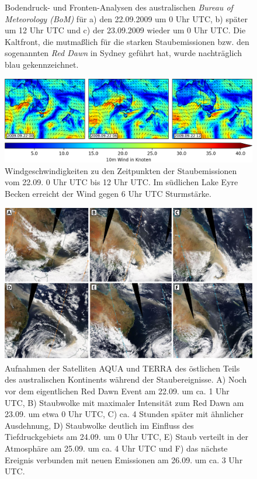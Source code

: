 \documentclass[12pt,a4paper,onecolumn]{scrartcl}
\begin{document}
\begin{figure}[!htb]
\begin{minipage}[c]{0.33\textwidth}
	\end{minipage}\hfill
	\caption{Bodendruck- und Fronten-Analysen des australischen \textit{Bureau of Meteorology (BoM)} für a) den 22.09.2009 um 0 Uhr UTC, b) später um 12 Uhr UTC und c) der 23.09.2009 wieder um 0 Uhr UTC. Die Kaltfront, die mutmaßlich für die starken Staubemissionen bzw. den sogenannten \textit{Red Dawn} in Sydney geführt hat, wurde nachträglich blau gekennzeichnet.} \label{fig:bom_analysis}
\end{figure}
\begin{figure}[!htb]
\includegraphics[width=\textwidth]{bilder/reddawn/wind_reddawn_small.png}
\caption{Windgeschwindigkeiten zu den Zeitpunkten der Staubemissionen vom 22.09. 0 Uhr UTC bis 12 Uhr UTC. Im südlichen Lake Eyre Becken erreicht der Wind gegen 6 Uhr UTC Sturmstärke.} \label{fig:wind_reddawn}
\end{figure}
\begin{figure}[!htb]
\includegraphics[width=\textwidth]{bilder/reddawn/reddawn_satellite.pdf}
\caption{Aufnahmen der Satelliten AQUA und TERRA des östlichen Teils des australischen Kontinents während der Staubereignisse. A) Noch vor dem eigentlichen Red Dawn Event am 22.09. um ca. 1 Uhr UTC, B) Staubwolke mit maximaler Intensität zum Red Dawn am 23.09. um etwa 0 Uhr UTC, C) ca. 4 Stunden später mit ähnlicher Ausdehnung, D) Staubwolke deutlich im Einfluss des Tiefdruckgebiets am 24.09. um 0 Uhr UTC, E) Staub verteilt in der Atmosphäre am 25.09. um ca. 4 Uhr UTC und F) das nächste Ereignis verbunden mit neuen Emissionen am 26.09. um ca. 3 Uhr UTC.} \label{fig:satellite}
\end{figure}
\end{document}
